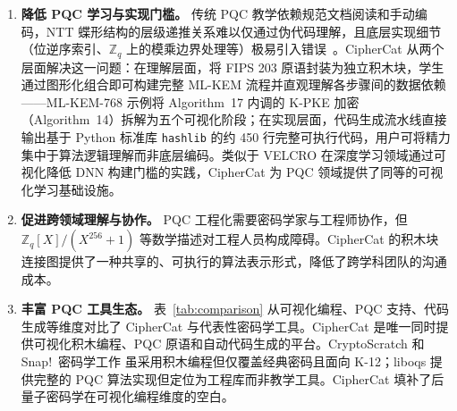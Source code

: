 \documentclass[preprint,12pt,a4paper]{elsarticle}
\begin{document}
\begin{enumerate}
	\item \textbf{降低 PQC 学习与实现门槛。} 传统 PQC 教学依赖规范文档阅读和手动编码，NTT 蝶形结构的层级递推关系难以仅通过伪代码理解，且底层实现细节（位逆序索引、$\mathbb{Z}_q$ 上的模乘边界处理等）极易引入错误~\cite{nejatollahi2019}。CipherCat 从两个层面解决这一问题：在理解层面，将 FIPS 203 原语封装为独立积木块，学生通过图形化组合即可构建完整 ML-KEM 流程并直观理解各步骤间的数据依赖——ML-KEM-768 示例将 Algorithm~17 内调的 K-PKE 加密（Algorithm~14）拆解为五个可视化阶段；在实现层面，代码生成流水线直接输出基于 Python 标准库 \texttt{hashlib} 的约 450 行完整可执行代码，用户可将精力集中于算法逻辑理解而非底层编码。类似于 VELCRO \cite{lim2024velcro} 在深度学习领域通过可视化降低 DNN 构建门槛的实践，CipherCat 为 PQC 领域提供了同等的可视化学习基础设施。
	\item \textbf{促进跨领域理解与协作。} PQC 工程化需要密码学家与工程师协作，但 $\mathbb{Z}_q[X]/(X^{256}+1)$ 等数学描述对工程人员构成障碍。CipherCat 的积木块连接图提供了一种共享的、可执行的算法表示形式，降低了跨学科团队的沟通成本。
	\item \textbf{丰富 PQC 工具生态。} 表~\ref{tab:comparison} 从可视化编程、PQC 支持、代码生成等维度对比了 CipherCat 与代表性密码学工具。CipherCat 是唯一同时提供可视化积木编程、PQC 原语和自动代码生成的平台。CryptoScratch \cite{percival2022cryptoscratch} 和 Snap!~密码学工作 \cite{lodi2022cryptography} 虽采用积木编程但仅覆盖经典密码且面向 K-12；liboqs \cite{stebila2017} 提供完整的 PQC 算法实现但定位为工程库而非教学工具。CipherCat 填补了后量子密码学在可视化编程维度的空白。
\end{enumerate}
\end{document}
